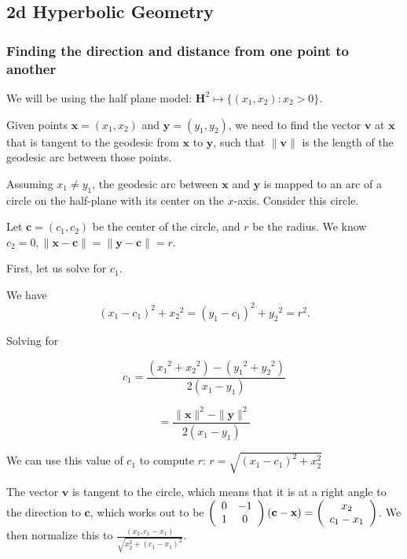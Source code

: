 \subsection{2d Hyperbolic Geometry}

\subsubsection{Finding the direction and distance from one point to another}

We will be using the half plane model: $\textbf{H}^2 \mapsto \{(x_1,x_2):x_2 > 0\}$.

Given points $\textbf{x} = (x_1,x_2)$ and $\textbf{y} = (y_1,y_2)$, we need to find the vector $\textbf{v}$ at $\textbf{x}$ that is tangent to the geodesic from $\textbf{x}$ to $\textbf{y}$, such that $\|\textbf{v}\|$ is the length of the geodesic arc between those points.

Assuming $x_1 \neq y_1$, the geodesic arc between $\textbf{x}$ and $\textbf{y}$ is mapped to an arc of a circle on the half-plane with its center on the $x$-axis. Consider this circle.

Let $\textbf{c} = (c_1,c_2)$ be the center of the circle, and $r$ be the radius. We know $c_2 = 0, \|\textbf{x}-\textbf{c}\| = \|\textbf{y}-\textbf{c}\| = r$.

First, let us solve for $c_1$.

We have $$(x_1-c_1)^2+{x_2}^2 = (y_1-c_1)^2+{y_2}^2 = r^2.$$


Solving for 

$$c_1 = \frac{({x_1}^2+{x_2}^2)-({y_1}^2+{y_2}^2)}{2(x_1-y_1)}$$

$$= \frac{\|\textbf{x}\|^2-\|\textbf{y}\|^2}{2(x_1-y_1)}$$

We can use this value of $c_1$ to compute $r$: $r = \sqrt{(x_1 - c_1)^2 + x_2^2}$

The vector $\textbf{v}$ is tangent to the circle, which means that it is at a right angle to the direction to $\textbf{c}$, which works out to be $\left(\begin{array}{ccc} 0 & -1 \\1 & 0 \end{array} \right)(\textbf{c}-\textbf{x}) = \left(\begin{array}{ccc} x_2 \\c_1-x_1 \end{array} \right)$. We then normalize this to $\displaystyle{\frac{(x_2,c_1-x_1)}{\sqrt{x_2^2+(c_1-x_1)^2}}}$.

